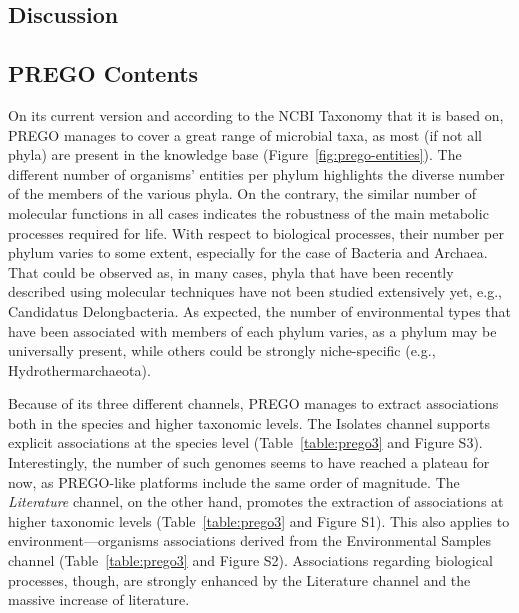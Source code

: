 {%
\subsection{Discussion}
\label{sec:prego-discussion}

   \subsection*{PREGO Contents}
   \label{subsec:prego-contents-disc}

   On its current version and according to the NCBI Taxonomy that it is based on, PREGO manages to cover a great range of microbial taxa, as most (if not all phyla) are present in the knowledge base (Figure~\ref{fig:prego-entities}). 
   The different number of organisms' entities per phylum highlights the diverse number of the members of the various phyla. On the contrary, the similar number of molecular functions in all cases indicates the robustness of the main metabolic processes required for life. 
   With respect to biological processes, their number per phylum varies to some extent, especially for the case of Bacteria and Archaea. 
   That could be observed as, in many cases, phyla that have been recently described using molecular techniques have not been studied extensively yet, e.g., Candidatus Delongbacteria. 
   As expected, the number of environmental types that have been associated with members of each phylum varies, as a phylum may be universally present, while others could be strongly niche-specific (e.g., Hydrothermarchaeota).

   Because of its three different channels, PREGO manages to extract associations both in the species and higher taxonomic levels. The Isolates channel supports explicit associations at the species level (Table~\ref{table:prego3} and Figure S3). 
   Interestingly, the number of such genomes seems to have reached a plateau for now, as PREGO-like platforms include the same order of magnitude. 
   The \textit{Literature} channel, on the other hand, promotes the extraction of associations at higher taxonomic levels (Table~\ref{table:prego3} and Figure S1). 
   This also applies to environment—organisms associations derived from the Environmental Samples channel (Table~\ref{table:prego3} and Figure S2). Associations regarding biological processes, though, are strongly enhanced by the Literature channel and the massive increase of literature.


}
